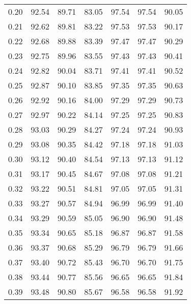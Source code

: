 \begin{tabular}{|c|c|c|c|c|c|c|}
      0.20 &     92.54 &     89.71 &      83.05 &   97.54 &      97.54 &         90.05 \\
      0.21 &     92.62 &     89.81 &      83.22 &   97.53 &      97.53 &         90.17 \\
      0.22 &     92.68 &     89.88 &      83.39 &   97.47 &      97.47 &         90.29 \\
      0.23 &     92.75 &     89.96 &      83.55 &   97.43 &      97.43 &         90.41 \\
      0.24 &     92.82 &     90.04 &      83.71 &   97.41 &      97.41 &         90.52 \\
      0.25 &     92.87 &     90.10 &      83.85 &   97.35 &      97.35 &         90.63 \\
      0.26 &     92.92 &     90.16 &      84.00 &   97.29 &      97.29 &         90.73 \\
      0.27 &     92.97 &     90.22 &      84.14 &   97.25 &      97.25 &         90.83 \\
      0.28 &     93.03 &     90.29 &      84.27 &   97.24 &      97.24 &         90.93 \\
      0.29 &     93.08 &     90.35 &      84.42 &   97.18 &      97.18 &         91.03 \\
      0.30 &     93.12 &     90.40 &      84.54 &   97.13 &      97.13 &         91.12 \\
      0.31 &     93.17 &     90.45 &      84.67 &   97.08 &      97.08 &         91.21 \\
      0.32 &     93.22 &     90.51 &      84.81 &   97.05 &      97.05 &         91.31 \\
      0.33 &     93.27 &     90.57 &      84.94 &   96.99 &      96.99 &         91.40 \\
      0.34 &     93.29 &     90.59 &      85.05 &   96.90 &      96.90 &         91.48 \\
      0.35 &     93.34 &     90.65 &      85.18 &   96.87 &      96.87 &         91.58 \\
      0.36 &     93.37 &     90.68 &      85.29 &   96.79 &      96.79 &         91.66 \\
      0.37 &     93.40 &     90.72 &      85.43 &   96.70 &      96.70 &         91.75 \\
      0.38 &     93.44 &     90.77 &      85.56 &   96.65 &      96.65 &         91.84 \\
      0.39 &     93.48 &     90.80 &      85.67 &   96.58 &      96.58 &         91.92 \\

\end{tabular}
